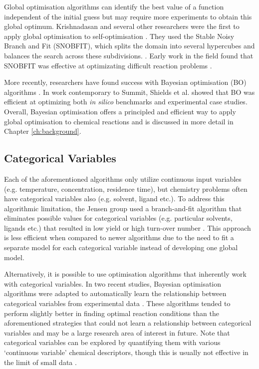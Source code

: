 Global optimisation algorithms can identify the best value of a function independent of the initial guess but may require more experiments to obtain this global optimum. Krishnadasan and several other researchers were the first to apply global optimisation to self-optimisation \cite{Holmes2016b, Krishnadasan2007, McMullen2010a}. They used the Stable Noisy Branch and Fit (SNOBFIT), which splits the domain into several hypercubes and balances the search across these subdivisions. \cite{Huyer2008}. Early work in the field found that SNOBFIT was effective at optimizating difficult reaction problems \cite{McMullen2010a}.

More recently, researchers have found success with Bayesian optimisation (BO) algorithms \cite{Schweidtmann2018, Amar2019, Hase2020, Shields2021, Manson2021}. In work contemporary to Summit, Shields et al. showed that BO was efficient at optimizing both \textit{in silico} benchmarks and experimental case studies. Overall, Bayesian optimisation offers a principled and efficient way to apply global optimisation to chemical reactions and is discussed in more detail in Chapter \ref{ch:background}.

\subsection{Categorical Variables}
Each of the aforementioned algorithms only utilize continuous input variables (e.g. temperature, concentration, residence time), but chemistry problems often have categorical variables also (e.g. solvent, ligand etc.). To address this algorithmic limitation, the Jensen group used a branch-and-fit algorithm that eliminates possible values for categorical variables (e.g. particular solvents, ligands etc.) that resulted in low yield or high turn-over number \cite{Reizman2016a, Baumgartner2018}. This approach is less efficient when compared to newer algorithms due to the need to fit a separate model for each categorical variable instead of developing one global model.

Alternatively, it is possible to use optimisation algorithms that inherently work with categorical variables. In two recent studies, Bayesian optimisation algorithms were adapted to automatically learn the relationship between categorical variables from experimental data \cite{Manson2021, Hase2021}. These algorithms tended to perform slightly better in finding optimal reaction conditions than the aforementioned strategies that could not learn a relationship between categorical variables and may be a large research area of interest in future. Note that categorical variables can be explored by quantifying them with various ‘continuous variable’ chemical descriptors, though this is usually not effective in the limit of small data \cite{Pomberger2023}.

